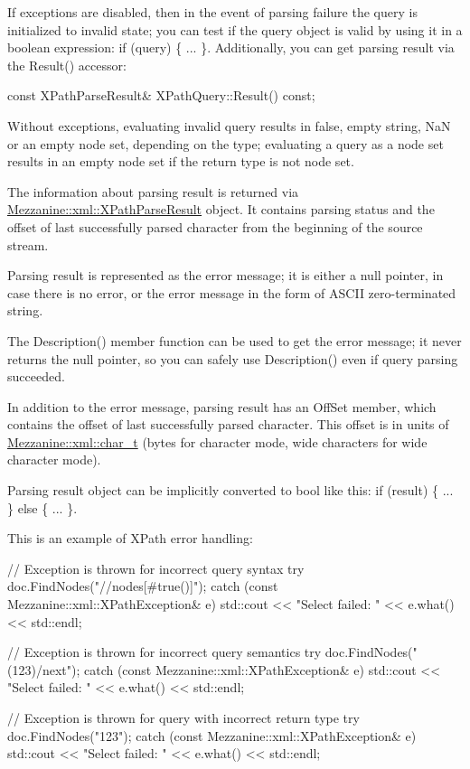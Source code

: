  If exceptions are disabled, then in the event of parsing failure the query is initialized to invalid state; you can test if the query object is valid by using it in a boolean expression: if (query) \{ ... \}. Additionally, you can get parsing result via the Result() accessor: 
\begin{DoxyCode}
 const XPathParseResult& XPathQuery::Result() const;
\end{DoxyCode}
 Without exceptions, evaluating invalid query results in false, empty string, NaN or an empty node set, depending on the type; evaluating a query as a node set results in an empty node set if the return type is not node set. \par
 \par
 The information about parsing result is returned via \hyperlink{structMezzanine_1_1xml_1_1XPathParseResult}{Mezzanine::xml::XPathParseResult} object. It contains parsing status and the offset of last successfully parsed character from the beginning of the source stream. \par
 \par
 Parsing result is represented as the error message; it is either a null pointer, in case there is no error, or the error message in the form of ASCII zero-\/terminated string. \par
 \par
 The Description() member function can be used to get the error message; it never returns the null pointer, so you can safely use Description() even if query parsing succeeded. \par
 \par
 In addition to the error message, parsing result has an OffSet member, which contains the offset of last successfully parsed character. This offset is in units of \hyperlink{namespaceMezzanine_1_1xml_a29b8a47c179e9895c4e9e66c45d1dbbc}{Mezzanine::xml::char\_\-t} (bytes for character mode, wide characters for wide character mode). \par
 \par
 Parsing result object can be implicitly converted to bool like this: if (result) \{ ... \} else \{ ... \}. \par
 \par
 This is an example of XPath error handling: 
\begin{DoxyCode}
 // Exception is thrown for incorrect query syntax
 try
 {
     doc.FindNodes("//nodes[#true()]");
 }
 catch (const Mezzanine::xml::XPathException& e)
 {
     std::cout << "Select failed: " << e.what() << std::endl;
 }

 // Exception is thrown for incorrect query semantics
 try
 {
 doc.FindNodes("(123)/next");
 }
 catch (const Mezzanine::xml::XPathException& e)
 {
     std::cout << "Select failed: " << e.what() << std::endl;
 }

 // Exception is thrown for query with incorrect return type
 try
 {
     doc.FindNodes("123");
 }
 catch (const Mezzanine::xml::XPathException& e)
 {
     std::cout << "Select failed: " << e.what() << std::endl;
 }
\end{DoxyCode}
